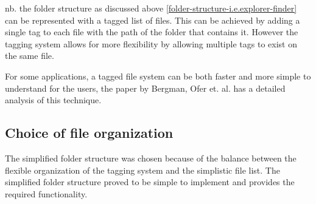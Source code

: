 nb. the folder structure as discussed above
\ref{folder-structure-i.e.explorer-finder} can be represented with a tagged list
of files. This can be achieved by adding a single tag to each file with the path
of the folder that contains it. However the tagging system allows for more
flexibility by allowing multiple tags to exist on the same file.

For some applications, a tagged file system can be both faster and more simple
to understand for the users, the paper by Bergman, Ofer et. al.\cite{ASI:ASI22906}
has a detailed analysis of this technique.

\subsection{Choice of file organization}\label{choice-of-file-organization}

The simplified folder structure was chosen because of the balance
between the flexible organization of the tagging system and the
simplistic file list. The simplified folder structure proved to be
simple to implement and provides the required functionality.


